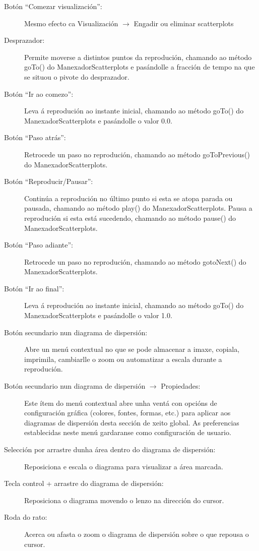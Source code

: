 \begin{description}
\begin{description}

\item[Botón ``Comezar visualización'':] \hfill
Mesmo efecto ca Visualización $\rightarrow$ Engadir ou eliminar scatterplots

\item[Desprazador:] \hfill
Permite moverse a distintos puntos da reprodución, chamando ao método goTo() do ManexadorScatterplots e pasándolle a fracción de tempo na que se situou o pivote do desprazador.

\item[Botón ``Ir ao comezo'':] \hfill
Leva á reprodución ao instante inicial, chamando ao método goTo() do ManexadorScatterplots e pasándolle o valor 0.0.

\item[Botón ``Paso atrás'':] \hfill
Retrocede un paso no reprodución, chamando ao método goToPrevious() do ManexadorScatterplots.

\item[Botón ``Reproducir/Pausar'':] \hfill
Continúa a reprodución no último punto si esta se atopa parada ou pausada, chamando ao método play() do ManexadorScatterplots. Pausa a reprodución si esta está sucedendo, chamando ao método pause() do ManexadorScatterplots.

\item[Botón ``Paso adiante'':] \hfill
Retrocede un paso no reprodución, chamando ao método gotoNext() do ManexadorScatterplots.

\item[Botón ``Ir ao final'':] \hfill
Leva á reprodución ao instante inicial, chamando ao método goTo() do ManexadorScatterplots e pasándolle o valor 1.0.

\item[Botón secundario nun diagrama de dispersión:] \hfill
Abre un menú contextual no que se pode almacenar a imaxe, copiala, imprimila, cambiarlle o zoom ou automatizar a escala durante a reprodución.

\item[Botón secundario nun diagrama de dispersión $\rightarrow$ Propiedades:] \hfill
Este ítem do menú contextual abre unha ventá con opcións de configuración gráfica (colores, fontes, formas, etc.) para aplicar aos diagramas de dispersión desta sección de xeito global. As preferencias establecidas neste menú gardaranse como configuración de usuario.

\item[Selección por arrastre dunha área dentro do diagrama de dispersión:] \hfill
Reposiciona e escala o diagrama para visualizar a área marcada.

\item[Tecla control + arrastre do diagrama de dispersión:] \hfill
Reposiciona o diagrama movendo o lenzo na dirección do cursor.

\item[Roda do rato:] \hfill
Acerca ou afasta o zoom o diagrama de dispersión sobre o que repousa o cursor.

\end{description}

\end{description}


